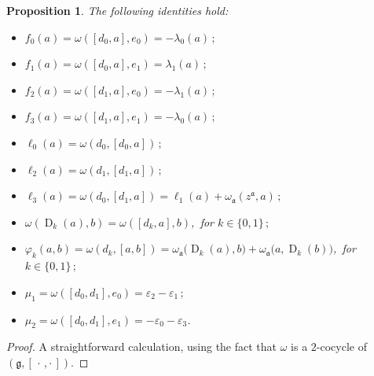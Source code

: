 \documentclass[final,1p,times,nopreprintline]{elsarticle}
\newtheorem{proposition}{Proposition}[section]
\theoremstyle{definition}
\numberwithin{equation}{section}
\newcommand{\w}{\omega}
\newcommand{\g}{\mathfrak{g}}
\newcommand{\ai}{\mathfrak{a}}
\numberwithin{equation}{section}
\newcommand{\D}{\operatorname{D}}
\newcommand{\cro}{[\,\cdot\,,\cdot\,]}
\begin{document}
\begin{proposition}
	The following identities hold:
	\begin{itemize}
		\item[$1.$] $f_0(a)=\w([d_0,a],e_0)=-\lambda_0(a)\,;$\vspace{1mm}
		\item[$2.$] $f_1(a)=\w([d_0,a],e_1)=\lambda_1(a)\,;$\vspace{1mm}
		\item[$3.$] $f_2(a)=\w([d_1,a],e_0)=-\lambda_1(a)\,;$\vspace{1mm}
		\item[$4.$] $f_3(a)=\w([d_1,a],e_1)=-\lambda_0(a)\,;$\vspace{1mm}
		\item[$5.$] $\ell_0(a)=\w(d_0,[d_0,a])\,;$\vspace{1mm}
		\item[$6.$] $\ell_2(a)=\w(d_1,[d_1,a])\,;$\vspace{1mm}
		\item[$7.$] $\ell_3(a)=\w(d_0,[d_1,a])=\ell_1(a)+\w_\ai(z^\ai,a)\,;$\vspace{1mm}
		\item[$8.$] $\w(\D_k(a),b)=\w([d_k,a],b)$,\, for $k\in\{0,1\}\,;$\vspace{1mm}
		\item[$9.$] $\varphi_k(a,b)=\w(d_k,[a,b])=\w_\ai\big(\D_k(a),b\big)+\w_\ai\big(a,\D_k(b)\big)$,\, for $k\in\{0,1\}\,;$\vspace{1mm}
		\item[$10.$] $\mu_1=\w([d_0,d_1],e_0)=\varepsilon_2-\varepsilon_1\,;$\vspace{1mm}
		\item[$11.$] $\mu_2=\w([d_0,d_1],e_1)=-\varepsilon_0-\varepsilon_3$.
	\end{itemize}
\end{proposition}

\begin{proof}
	A straightforward calculation, using the fact that $\w$ is a $2$-cocycle of $(\g,\cro)$.
\end{proof}
\end{document}
